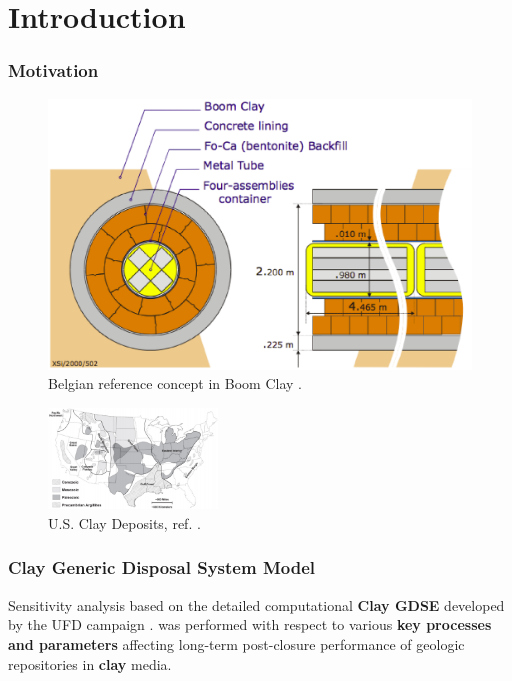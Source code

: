 
\section{Introduction}
\begin{frame}[c]
  \frametitle{Motivation}
     \begin{figure}[h!]
         \includegraphics[width=.4\textwidth]{belgianClayRedImp.eps}
         \caption{Belgian reference concept in Boom Clay 
         \cite{von_lensa_red-impact_2008}.}
     \end{figure}
     \begin{figure}[h!]
         \includegraphics[width=0.4\textwidth]{clayGonzales.eps}
         \caption{U.S. Clay Deposits, ref. \cite{gonzales_shales_1985}.}
     \end{figure}
   \hspace{0.01cm}
\end{frame}

\begin{frame}[c]
  \frametitle{Clay Generic Disposal System Model}
Sensitivity analysis based on the detailed computational \textbf{Clay 
  \gls{GDSE}} developed by the \gls{UFD} campaign \cite{clayton_generic_2011}.  
  was performed with respect to various \textbf{key processes and parameters} 
  affecting long-term post-closure performance of geologic repositories in 
  \textbf{clay} media.

\end{frame}


